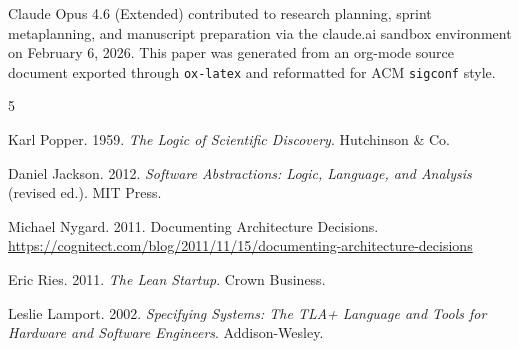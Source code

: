 \documentclass[sigconf,screen]{acmart}
\begin{document}
\begin{acks}
Claude Opus 4.6 (Extended) contributed to research planning, sprint metaplanning, and manuscript preparation via the claude.ai sandbox environment on February 6, 2026. This paper was generated from an org-mode source document exported through \texttt{ox-latex} and reformatted for ACM \texttt{sigconf} style.
\end{acks}


\begin{thebibliography}{5}

Karl Popper. 1959. \emph{The Logic of Scientific Discovery}. Hutchinson \& Co.

Daniel Jackson. 2012. \emph{Software Abstractions: Logic, Language, and Analysis} (revised ed.). MIT Press.

Michael Nygard. 2011. Documenting Architecture Decisions. \url{https://cognitect.com/blog/2011/11/15/documenting-architecture-decisions}

Eric Ries. 2011. \emph{The Lean Startup}. Crown Business.

Leslie Lamport. 2002. \emph{Specifying Systems: The TLA+ Language and Tools for Hardware and Software Engineers}. Addison-Wesley.

\end{thebibliography}
\end{document}
